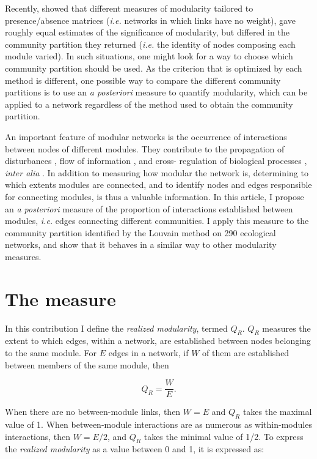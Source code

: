 \documentclass[12pt,oneside]{article}
\begin{document}
Recently, \textcite{thebault_identifying_2012} showed that different measures
of modularity tailored to presence/absence matrices (\emph{i.e.} networks in
which links have no weight), gave roughly equal estimates of the significance
of modularity, but differed in the community partition they returned
(\emph{i.e.} the identity of nodes composing each module varied). In such
situations, one might look for a way to choose which community partition should
be used. As the criterion that is optimized by each method is different, one
possible way to compare the different community partitions is to use an
\emph{a posteriori} measure to quantify modularity, which can be applied to a
network regardless of the method used to obtain the community partition.

An important feature of modular networks is the occurrence of interactions
between nodes of different modules. They contribute to the propagation of
disturbances \parencite{olesen_modularity_2007}, flow of information
\cite{wiederhold_mediators_1992,leskovec_statistical_2008}, and cross-
regulation of biological processes \cite{hartwell_molecular_1999}, \emph{inter
alia} \cite{rosvall_maps_2008}. In addition to measuring how modular the
network is, determining to which extents modules are connected, and to
identify nodes and edges responsible for connecting modules, is thus a
valuable information. In this article, I propose an \emph{a posteriori}
measure of the proportion of interactions established between modules,
\emph{i.e.} edges connecting different communities. I apply this measure to
the community partition identified by the Louvain method on 290 ecological
networks, and show that it behaves in a similar way to other modularity
measures.

\section{The measure}

In this contribution I define the \emph{realized modularity}, termed $Q_R$.
$Q_R$ measures the extent to which edges, within a network, are established
between nodes belonging to the same module. For $E$ edges in a network, if $W$
of them are established between members of the same module, then

\begin{equation}
	Q_R = \frac{W}{E} .
 	\label{e:qr}
\end{equation} 

When there are no between-module links, then $W = E$ and $Q_R$ takes the
maximal value of 1. When between-module interactions are as numerous as
within-modules interactions, then $W = E/2$, and $Q_R$ takes the minimal value
of 1/2. To express the \emph{realized modularity} as a value between 0 and 1,
it is expressed as:
\end{document}
